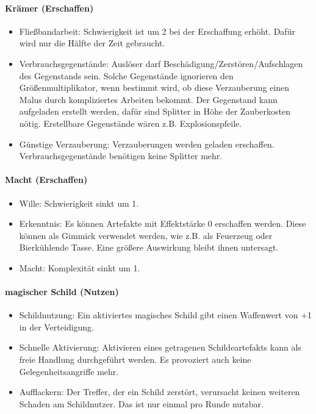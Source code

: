\documentclass{article}
\begin{document}
\paragraph{Krämer (Erschaffen)}

\begin{itemize}
\item Fließbandarbeit: Schwierigkeit ist um 2 bei der Erschaffung erhöht. Dafür wird nur die Hälfte der Zeit gebraucht.
\item Verbrauchsgegenstände: Auslöser darf Beschädigung/Zerstören/Aufschlagen des Gegenstands sein. Solche Gegenstände ignorieren den Größenmultiplikator, wenn bestimmt wird, ob diese Verzauberung einen Malus durch kompliziertes Arbeiten bekommt. Der Gegenstand kann aufgeladen erstellt werden, dafür sind Splitter in Höhe der Zauberkosten nötig. Erstellbare Gegenstände wären z.B. Explosionspfeile.
\item Günstige Verzauberung: Verzauberungen werden geladen erschaffen. Verbrauchsgegenstände benötigen keine Splitter mehr.
\end{itemize}

\paragraph{Macht (Erschaffen)}

\begin{itemize}
\item Wille: Schwierigkeit sinkt um 1.
\item Erkenntnis: Es können Artefakte mit Effektstärke 0 erschaffen werden. Diese können als Gimmick verwendet werden, wie z.B. als Feuerzeug oder Bierkühlende Tasse. Eine größere Auswirkung bleibt ihnen untersagt.
\item Macht: Komplexität sinkt um 1.
\end{itemize}

\paragraph{magischer Schild (Nutzen)}

\begin{itemize}
\item Schildnutzung: Ein aktiviertes magisches Schild gibt einen Waffenwert von +1 in der Verteidigung.
\item Schnelle Aktivierung: Aktivieren eines getragenen Schildeartefakts kann als freie Handlung durchgeführt werden. Es provoziert auch keine Gelegenheitsangriffe mehr.
\item Aufflackern: Der Treffer, der ein Schild zerstört, verursacht keinen weiteren Schaden am Schildnutzer. Das ist nur einmal pro Runde nutzbar.
\end{itemize}
\end{document}
